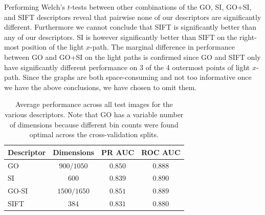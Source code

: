 \documentclass[thesis.tex]{subfiles}
\begin{document}
Performing Welch's $t$-tests between other combinations of the GO, SI, GO+SI, and SIFT descriptors reveal that pairwise none of our descriptors are significantly different. Furthermore we cannot conclude that SIFT is significantly better than any of our descriptors. SI is however significantly better than SIFT on the right-most position of the light $x$-path. The marginal difference in performance between GO and GO+SI on the light paths is confirmed since GO and SIFT only have significantly different performance on 3 of the 4 outermost points of light $x$-path. Since the graphs are both space-consuming and not too informative once we have the above conclusions, we have chosen to omit them. 
%
\begin{table}[tb]
\centering
\begin{tabular}{ l c c c }
\toprule
Descriptor & Dimensions & PR AUC & ROC AUC \\ \midrule
GO & $900/1050$ & $0.850$ & $0.888$ \\ 
SI & $600$ & $0.839$ & $0.890$ \\ 
GO-SI & $1500/1650$ & $0.851$ & $0.889$ \\ 
SIFT & $384$ & $0.831$ & $0.880$ \\ 
\bottomrule
\end{tabular}
\caption{Average performance across all test images for the various descriptors. Note that GO has a variable number of dimensions because different bin counts were found optimal across the cross-validation splits.}
\label{tbl:dtuOverallResults}
\end{table}
%
\end{document}
